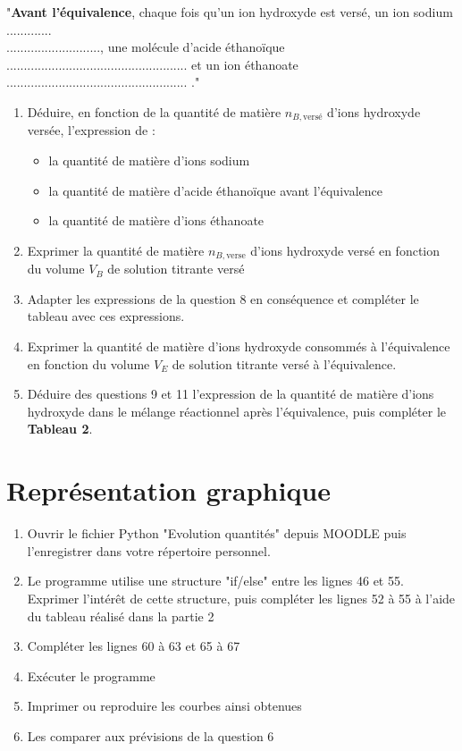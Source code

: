 \documentclass[a4paper,11pt,fleqn]{article}%
\begin{document}
"\textbf{Avant l'équivalence}, chaque fois qu'un ion hydroxyde  est versé, un ion sodium  .............\\..........................., une molécule d'acide éthanoïque  .................................................... et un ion éthanoate  .................................................... ."
\begin{enumerate}[resume]
	\item Déduire, en fonction de la quantité de matière $n_{B,\text{versé}}$ d'ions hydroxyde versée, l'expression de :
		\begin{itemize}
			\item la quantité de matière d'ions sodium 
			\item la quantité de matière d'acide éthanoïque  avant l'équivalence
			\item la quantité de matière d'ions éthanoate 
		\end{itemize}
		\item Exprimer la quantité de matière $n_{B,\text{verse}}$ d'ions hydroxyde versé en fonction du volume $V_B$ de solution titrante versé
		\item Adapter les expressions de la question 8 en conséquence et compléter le tableau avec ces expressions.
		\item Exprimer la quantité de matière d'ions hydroxyde  consommés à l'équivalence en fonction du volume $V_E$ de solution titrante versé à l'équivalence.
		\item Déduire des questions 9 et 11 l'expression de la quantité de matière d'ions hydroxyde  dans le mélange réactionnel après l'équivalence, puis compléter le \textbf{Tableau 2}.
\end{enumerate}

\section{Représentation graphique}
\begin{enumerate}[resume]
	\item Ouvrir le fichier Python "Evolution quantités" depuis MOODLE puis l'enregistrer dans votre répertoire personnel.
	\item Le programme utilise une structure "if/else" entre les lignes 46 et 55. Exprimer l'intérêt de cette structure, puis compléter les lignes 52 à 55 à l'aide du tableau réalisé dans la partie 2
	\item Compléter les lignes 60 à 63 et 65 à 67
	\item Exécuter le programme
	\item Imprimer ou reproduire les courbes ainsi obtenues
	\item Les comparer aux prévisions de la question 6
\end{enumerate}
\end{document}

